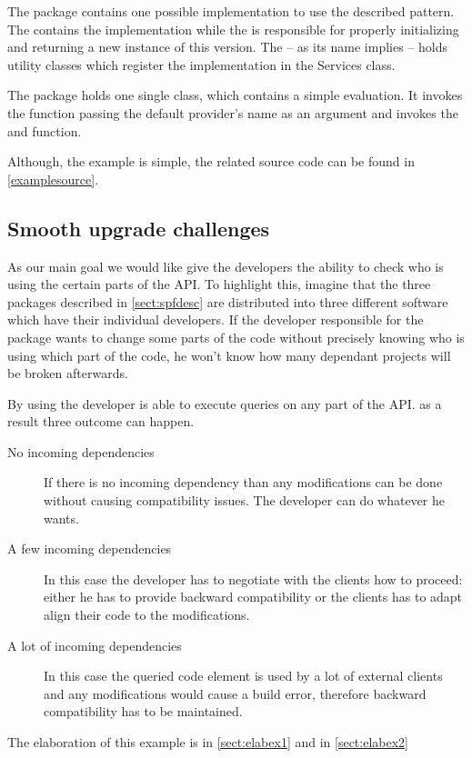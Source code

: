 The  package contains one possible implementation to use the
described pattern. The  contains the implementation while the
 is responsible for properly initializing and returning a
new instance of this version. The  -- as its name implies --
holds utility classes which register the implementation in the Services class.

The  package holds one single  class, which contains a
simple evaluation. It invokes the  function passing
the default provider's name as an argument and invokes the  and
 function.

Although, the example is simple, the related source code can be found in
\autoref{examplesource}.

\subsection{Smooth upgrade challenges}
As our main goal we would like give the developers the ability to check who is
using the certain parts of the API. To highlight this, imagine that the three
packages described in \autoref{sect:spfdesc} are distributed into three
different software which have their individual developers. If the developer
responsible for the  package wants to change some parts of the
code without precisely knowing who is using which part of the code, he won't
know how many dependant projects will be broken afterwards. 

By using \ptool{} the developer is able to execute queries on any part of the
API. as a result three outcome can happen.
\begin{description}
  \item[No incoming dependencies] If there is no incoming dependency than any modifications can be done without
causing compatibility issues. The developer can do whatever he wants.
  \item[A few incoming dependencies] In this case the developer has to negotiate
with the clients how to proceed: either he has to provide backward compatibility or the
clients has to adapt align their code to the modifications.
  \item[A lot of incoming dependencies] In this case the queried code
element is used by a lot of external clients and any modifications would cause a build
error, therefore backward compatibility has to be maintained.
\end{description}
The elaboration of this example is in \autoref{sect:elabex1} and in \autoref{sect:elabex2}